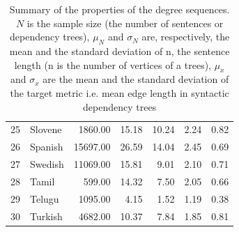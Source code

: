 \documentclass[a4paper]{article}
\begin{document}
\begin{table}[hbtp]
\begin{tabular}{rlrrrrr}
		25 & Slovene & 1860.00 & 15.18 & 10.24 & 2.24 & 0.82 \\ 
		26 & Spanish & 15697.00 & 26.59 & 14.04 & 2.45 & 0.69 \\ 
		27 & Swedish & 11069.00 & 15.81 & 9.01 & 2.10 & 0.71 \\ 
		28 & Tamil & 599.00 & 14.32 & 7.50 & 2.05 & 0.66 \\ 
		29 & Telugu & 1095.00 & 4.15 & 1.52 & 1.19 & 0.38 \\ 
		30 & Turkish & 4682.00 & 10.37 & 7.84 & 1.85 & 0.81 \\ 
		\hline
	\end{tabular}
\caption{Summary of the properties of the degree sequences. $N$ is the sample size (the number of sentences or dependency trees), $\mu_N$ and $\sigma_N$ are, respectively, the mean and the standard deviation of n, the sentence length (n is the number of vertices of a trees), $\mu_x$ and $\sigma_x$ are the mean and the standard deviation of the target metric
i.e. mean edge length in syntactic dependency trees}
\end{table}
\end{document}
